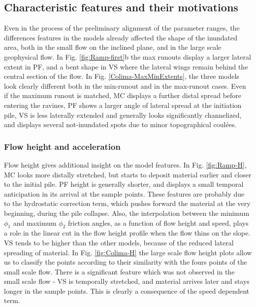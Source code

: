 \documentclass{article}
\begin{document}
\subsection{Characteristic features and their motivations}
Even in the process of the preliminary alignment of the parameter ranges, the differences features in the models already affected the shape of the inundated area, both in the small flow on the inclined plane, and in the large scale geophysical flow. In Fig. \ref{fig:Ramp-first}b the max runouts display a larger lateral extent in PF, and a bent shape in VS where the lateral wings remain behind the central section of the flow. In Fig. \ref{Colima-MaxMinExtents}, the three models look clearly different both in the min-runout and in the max-runout cases. Even if the maximum runout is matched, MC displays a further distal spread before entering the ravines, PF shows a larger angle of lateral spread at the initiation pile, VS is less laterally extended and generally looks significantly channelized, and displays several not-inundated spots due to minor topographical coul\'{e}es.

\subsubsection{Flow height and acceleration}
Flow height gives additional insight on the model features. In Fig. \ref{fig:Ramp-H}, MC looks more distally stretched, but starts to deposit material earlier and closer to the initial pile. PF height is generally shorter, and displays a small temporal anticipation in its arrival at the sample points. These features are probably due to the hydrostatic correction term, which pushes forward the material at the very beginning, during the pile collapse. Also, the interpolation between the minimum $\phi_1$ and maximum $\phi_2$ friction angles, as a function of flow height and speed, plays a role in the linear cut in the flow height profile when the flow thins on the slope. VS tends to be higher than the other models, because of the reduced lateral spreading of material. In Fig. \ref{fig:Colima-H} the large scale flow height plots allow us to classify the points according to their similarity with the fours points of the small scale flow. There is a significant feature which was not observed in the small scale flow - VS is temporally stretched, and material arrives later and stays longer in the sample points. This is clearly a consequence of the speed dependent term.
\end{document}
